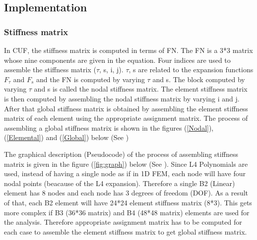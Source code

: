 \documentclass[a4paper,12pt]{article}
\begin{document}
\subsection*{Implementation}
\subsubsection*{Stiffness matrix}
\indent\indent In CUF, the stiffness matrix is computed in terms of FN. The FN is a 3*3 matrix whose nine components are given in the equation. Four indices are used to assemble the stiffness matrix ($\tau$, s, i, j). $\tau$, s are related to the expansion functions $F_{\tau}$ and $F_{s}$ and the FN is computed by varying $\tau$ and s. The block computed by varying $\tau$ and s is called the nodal stiffness matrix. The element stiffness matrix is then computed by assembling the nodal stiffness matrix by varying i and j. After that global stiffness matrix is obtained by assembling the element stiffness matrix of each element using the appropriate assignment matrix. The process of assembling a global stiffness matrix is shown in the figures   (\ref{Nodal}), (\ref{Elemental}) and (\ref{Global})  below (See \cite{carrera2014finite}) 

\indent\indent The graphical description (Pseudocode) of the process of assembling stiffness matrix is given in the figure (\ref{fig:graph}) below (See \cite{carrera2014finite}). Since L4 Polynomials are used, instead of having a single node as if in 1D FEM, each node will have four nodal points (beacause of the L4 expansion). Therefore a single B2 (Linear) element has 8 nodes and each node has 3 degrees of freedom (DOF). As a result of that, each B2 element will have 24*24 element stiffness matrix (8*3). This gets more complex if B3 (36*36 matrix) and B4 (48*48 matrix) elements are used for the analysis. Therefore appropriate assignment matrix has to be computed for each case to assemble the element stiffness matrix to get global stiffness matrix.
\end{document}
